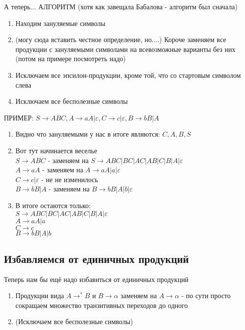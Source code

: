 \documentclass{article}
\begin{document}
А теперь... АЛГОРИТМ (хотя как завещала Бабалова - алгоритм был сначала)
\begin{enumerate}
  \item Находим зануляемые символы
    \item (могу сюда вставить честное определение, но....) Короче заменяем все продукции с зануляемыми символами на всевозможные варианты без них (потом на примере посмотреть надо)
    \item Исключаем все эпсилон-продукции, кроме той, что со стартовым символом слева
    \item Исключаем все бесполезные символы
\end{enumerate}

ПРИМЕР:
$S \to ABC, A \to aA| \varepsilon, C \to c | \varepsilon, B \to bB | A$
\begin{enumerate}
  \item Видно что зануляемыми у нас в итоге являются: $C, A, B, S$
    \item Вот тут начинается веселье\\
      $S \to ABC$ - заменяем на $ S \to ABC | BC | AC | AB | C | B | A | \varepsilon$ \\
        $A \to aA$ - заменяем на $A \to aA|a|\varepsilon$ \\
        $C \to c| \varepsilon$  - не не изменилось\\
        $B \to bB|A$ - заменяем на $B \to bB|A|b|\varepsilon$ \\
    \item В итоге остаются только:\\
        $ S \to ABC | BC | AC | AB | C | B | A | \varepsilon$ \\
        $A \to aA|a$ \\
        $C \to c$\\
         $B \to bB|A|b$ \\
\end{enumerate}

\subsection{Избавляемся от единичных продукций}
Теперь нам бы ещё надо избавиться от единичных продукций
\begin{enumerate}
  \item Продукции вида $A \to^* B$ и $B \to \alpha$ заменяем на $A \to \alpha$ - по сути просто сокращаем множество транзитивных переходов до одного
    \item (Исключаем все бесполезные символы)
\end{enumerate}
\end{document}
